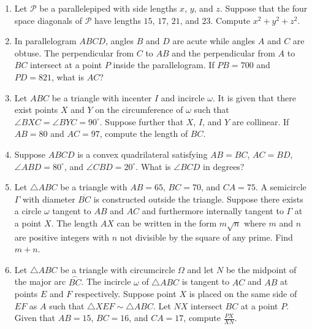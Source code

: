 \documentclass[10pt]{article}
\newcounter{enum}
\begin{document}
\begin{enumerate}
\setcounter{enumi}{\theenum}

\item Let $\mathcal{P}$ be a parallelepiped with side lengths $x$, $y$, and $z$.  Suppose that the four space diagonals of $\mathcal{P}$ have lengths $15$, $17$, $21$, and $23$.  Compute $x^2+y^2+z^2$. %

\item In parallelogram $ABCD$, angles $B$ and $D$ are acute while angles $A$ and $C$ are obtuse.  The perpendicular from $C$ to $AB$ and the perpendicular from $A$ to $BC$ intersect at a point $P$ inside the parallelogram.  If $PB=700$ and $PD=821$, what is $AC$? %

\item Let $ABC$ be a triangle with incenter $I$ and incircle $\omega$.  It is given that there exist points $X$ and $Y$ on the circumference of $\omega$ such that $\angle BXC=\angle BYC=90^\circ$.  Suppose further that $X$, $I$, and $Y$ are collinear.  If $AB=80$ and $AC=97$, compute the length of $BC$.  %


\item Suppose $ABCD$ is a convex quadrilateral satisfying $AB=BC$, $AC=BD$, $\angle ABD = 80^\circ$, and $\angle CBD = 20^\circ$.  What is $\angle BCD$ in degrees? %

\item Let $\triangle ABC$ be a triangle with $AB=65$, $BC=70$, and $CA=75$.  A semicircle $\Gamma$ with diameter $\overline{BC}$ is constructed outside the triangle.  Suppose there exists a circle $\omega$ tangent to $AB$ and $AC$ and furthermore internally tangent to $\Gamma$ at a point $X$.  The length $AX$ can be written in the form $m\sqrt{n}$ where $m$ and $n$ are positive integers with $n$ not divisible by the square of any prime.  Find $m+n$. %

\item Let $\triangle ABC$ be a triangle with circumcircle $\Omega$ and let $N$
be the midpoint of the major arc $\overset{\frown}{BC}$.  The incircle $\omega$
of $\triangle ABC$ is tangent to $AC$ and $AB$ at points $E$ and $F$
respectively.  Suppose point $X$ is placed on the same side of $EF$ as $A$ such
that $\triangle XEF\sim\triangle ABC$.  Let $NX$ intersect $BC$ at a point $P$.
Given that $AB=15$, $BC=16$, and $CA=17$, compute $\tfrac{PX}{XN}$. %


\end{enumerate}
\end{document}
